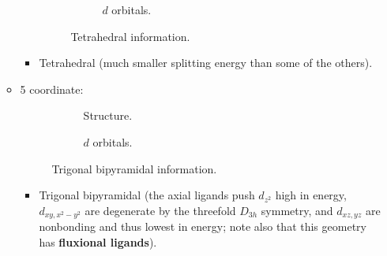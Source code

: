\documentclass[../notes.tex]{subfiles}
\begin{document}
\begin{itemize}
\begin{itemize}
\begin{itemize}
\begin{figure}[h!]
\begin{subfigure}[b]{0.3\linewidth}
                    \caption{$d$ orbitals.}
                    \label{fig:4-tetrab}
                \end{subfigure}
                \caption{Tetrahedral information.}
                \label{fig:4-tetra}
            \end{figure}
            \item Tetrahedral (much smaller splitting energy than some of the others).
        \end{itemize}
        \item 5 coordinate:
        \begin{figure}[h!]
            \centering
            \begin{subfigure}[b]{0.3\linewidth}
                \centering
                \caption{Structure.}
                \label{fig:5-trigBipyraa}
            \end{subfigure}
            \begin{subfigure}[b]{0.3\linewidth}
                \centering
                \caption{$d$ orbitals.}
                \label{fig:5-trigBipyrab}
            \end{subfigure}
            \caption{Trigonal bipyramidal information.}
            \label{fig:5-trigBipyra}
        \end{figure}
        \begin{itemize}
            \item Trigonal bipyramidal (the axial ligands push $d_{z^2}$ high in energy, $d_{xy,x^2-y^2}$ are degenerate by the threefold $D_{3h}$ symmetry, and $d_{xz,yz}$ are nonbonding and thus lowest in energy; note also that this geometry has \textbf{fluxional ligands}).

\end{itemize}
\end{itemize}
\end{itemize}
\end{document}
